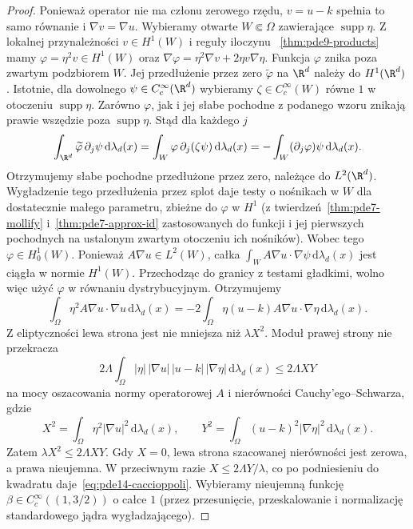 \begin{proof}
Ponieważ operator nie ma członu zerowego rzędu,
$v=u-k$ spełnia to samo równanie i $\nabla v=\nabla u$.
Wybieramy otwarte $W\Subset\Omega$ zawierające
$\operatorname{supp}\eta$. Z lokalnej przynależności
$v\in H^1(W)$ i reguły iloczynu
~\ref{thm:pde9-products} mamy
$\varphi=\eta^2v\in H^1(W)$ oraz
$\nabla\varphi=\eta^2\nabla v+2\eta v\nabla\eta$.
Funkcja $\varphi$ znika poza zwartym podzbiorem $W$.
Jej przedłużenie przez zero $\widetilde\varphi$ na
$\R^d$ należy do $H^1(\R^d)$. Istotnie, dla dowolnego
$\psi\in C_c^\infty(\R^d)$ wybieramy
$\zeta\in C_c^\infty(W)$ równe $1$ w otoczeniu
$\operatorname{supp}\eta$. Zarówno $\varphi$, jak i jej
słabe pochodne z podanego wzoru znikają prawie wszędzie
poza $\operatorname{supp}\eta$. Stąd dla każdego $j$
\[
 \int_{\R^d}\widetilde\varphi\,\partial_j\psi\,
 \mathrm d\lambda_d(x)
 =\int_W\varphi\,\partial_j(\zeta\psi)\,\mathrm d\lambda_d(x)
 =-\int_W(\partial_j\varphi)\psi\,\mathrm d\lambda_d(x).
\]
Otrzymujemy słabe pochodne przedłużone przez zero,
należące do $L^2(\R^d)$. Wygładzenie tego przedłużenia
przez splot daje testy o nośnikach w $W$ dla dostatecznie
małego parametru, zbieżne do $\varphi$ w $H^1$
(z twierdzeń~\ref{thm:pde7-mollify}
i~\ref{thm:pde7-approx-id} zastosowanych do funkcji
i jej pierwszych pochodnych na ustalonym zwartym
otoczeniu ich nośników).
Wobec tego $\varphi\in H_0^1(W)$.
Ponieważ $A\nabla u\in L^2(W)$, całka
$\int_W A\nabla u\cdot\nabla\psi\,\mathrm d\lambda_d(x)$
jest ciągła w normie $H^1(W)$. Przechodząc do granicy
z testami gładkimi, wolno więc użyć $\varphi$ w równaniu
dystrybucyjnym. Otrzymujemy
\[
 \int_\Omega\eta^2 A\nabla u\cdot\nabla u\,\mathrm d\lambda_d(x)
 =-2\int_\Omega\eta (u-k) A\nabla u\cdot\nabla\eta\,\mathrm d\lambda_d(x).
\]
Z eliptyczności lewa strona jest nie mniejsza niż
$\lambda X^2$. Moduł prawej strony nie przekracza
\[
 2\Lambda\int_\Omega |\eta|\,|\nabla u|\,
 |u-k|\,|\nabla\eta|\,\mathrm d\lambda_d(x)
 \le 2\Lambda XY
\]
na mocy oszacowania normy operatorowej $A$ i nierówności
Cauchy'ego--Schwarza, gdzie
\[
 X^2=\int_\Omega\eta^2|\nabla u|^2\,\mathrm d\lambda_d(x),
 \qquad
 Y^2=\int_\Omega (u-k)^2|\nabla\eta|^2\,\mathrm d\lambda_d(x).
\]
Zatem $\lambda X^2\le2\Lambda XY$.
Gdy $X=0$, lewa strona szacowanej nierówności jest zerowa,
a prawa nieujemna. W przeciwnym razie
$X\le 2\Lambda Y/\lambda$, co po podniesieniu do kwadratu
daje~\eqref{eq:pde14-caccioppoli}.
Wybieramy nieujemną funkcję $\beta\in C_c^\infty((1,3/2))$
o całce $1$ (przez przesunięcie, przeskalowanie
i normalizację standardowego jądra wygładzającego).

\end{proof}
